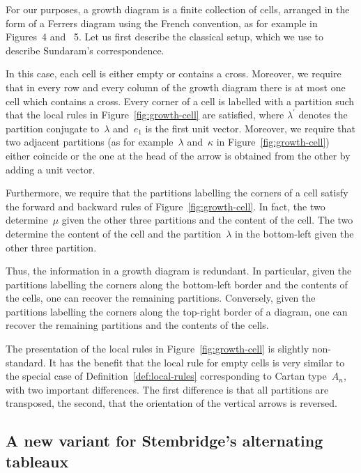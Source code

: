 For our purposes, a growth diagram is a finite collection of cells,
arranged in the form of a Ferrers diagram using the French
convention, as for example in Figures~4
and ~5. Let us first describe the
classical setup, which we use to describe Sundaram's correspondence.

In this case, each cell is either empty or contains a cross.
Moreover, we require that in every row and every column of the growth
diagram there is at most one cell which contains a cross. Every
corner of a cell is labelled with a partition such that the local
rules in Figure~\ref{fig:growth-cell} are satisfied, where
$\lambda^\prime$ denotes the partition conjugate to~$\lambda$
and~$e_1$ is the first unit vector. Moreover, we require that two
adjacent partitions (as for example~$\lambda$ and~$\kappa$ in
Figure~\ref{fig:growth-cell}) either coincide or the one at the head
of the arrow is obtained from the other by adding a unit vector.

Furthermore, we require that the partitions labelling the corners of
a cell satisfy the forward and backward rules of
Figure~\ref{fig:growth-cell}. In fact, the two 
determine~$\mu$ given the other three partitions and the content of
the cell. The two  determine the content of the
cell and the partition~$\lambda$ in the bottom-left given the other
three partition.

Thus, the information in a growth diagram is redundant. In
particular, given the partitions labelling the corners along the
bottom-left border and the contents of the cells, one can recover the
remaining partitions. Conversely, given the partitions labelling the
corners along the top-right border of a diagram, one can recover the
remaining partitions and the contents of the cells.

The presentation of the local rules in Figure~\ref{fig:growth-cell}
is slightly non-standard. It has the benefit that the local rule for
empty cells is very similar to the special case of
Definition~\ref{def:local-rules} corresponding to Cartan type~$A_n$,
with two important differences. The first difference is that all
partitions are transposed, the second, that the orientation of the
vertical arrows is reversed.


\subsection{A new variant for Stembridge's alternating tableaux}
\label{sec:Stembridge}

